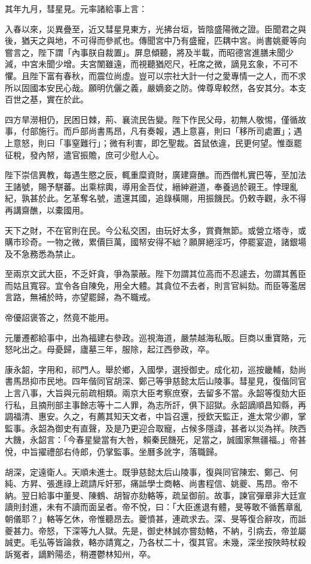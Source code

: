 \begin{pinyinscope}
其年九月，彗星見。元率諸給事上言：

入春以來，災異疊至，近又彗星見東方，光拂台垣，皆陰盛陽微之證。臣聞君之與後，猶天之與地，不可得而參貳也。傳聞宮中乃有盛寵，匹耦中宮。尚書姚夔等向嘗言之，陛下謂「內事朕自裁置」。屏息傾聽，將及半載，而昭德宮進膳未聞少減，中宮未聞少增。夫宮闈雖遠，而視聽猶咫尺，衽席之微，謫見玄象，不可不懼。且陛下富有春秋，而震位尚虛。豈可以宗社大計一付之愛專情一之人，而不求所以固國本安民心哉。願明伉儷之義，嚴嫡妾之防。俾尊卑較然，各安其分。本支百世之基，實在於此。

四方旱澇相仍，民困日棘，荊、襄流民告變。陛下作民父母，初無人敬惕，僅循故事，付部施行。而戶部尚書馬昂，凡有奏報，遇上意喜，則曰「移所司處置」；遇上意怒，則曰「事窒難行」；微有利害，即乞聖裁。首鼠依違，民更何望。惟亟罷征稅，發內帑，遣官振贍，庶可少慰人心。

陛下崇信異教，每遇生愍之辰，輒重糜資財，廣建齋醮。而西僧札實巴等，至加法王諸號，賜予駢蕃。出乘棕輿，導用金吾仗，縉紳避道，奉養過於親王。悖理亂紀，孰甚於此。乞革奪名號，遣還其國，追錄橫賜，用振饑民。仍敕寺觀，永不得再講齋醮，以橐國用。

天下之財，不在官則在民。今公私交困，由玩好太多，賞賚無節。或營立塔寺，或購市珍奇。一物之微，累價巨萬，國帑安得不絀？願屏絕淫巧，停罷宴遊，諸銀場及不急務悉為禁止。

至兩京文武大臣，不乏奸貪，爭為蒙蔽。陛下勿謂其位高而不忍遽去，勿謂其舊臣而姑且寬容。宜令各自陳免，用全大體。其貪位不去者，則言官糾劾。而臣等濫居言路，無補於時，亦望罷歸，為不職戒。

帝優詔褒答之，然竟不能用。

元屢遷都給事中，出為福建右參政。巡視海道，嚴禁越海私販。巨商以重寶賂，元怒叱出之。母憂歸，廬墓三年，服除，起江西參政，卒。

康永韶，字用和，祁門人。舉於鄉，入國學，選授御史。成化初，巡按畿輔，劾尚書馬昂抑市民地。四年偕同官胡深、鄭己等爭慈懿太后山陵事。彗星見，復偕同官上言八事，大旨與元前疏相類。兩京大臣考察庶寮，去留多不當。永韶等復劾大臣行私，且摘刑部主事餘志等十二人罪，為志所訐，俱下詔獄。永韶謫順昌知縣，再調福清、惠安。久之，有薦其知天文者，中旨召還，授欽天監正，進太常少卿，掌監事。永韶為御史有直聲，及是乃更迎合取寵，占候多隱諱，甚者以災為祥。陜西大饑，永韶言：「今春星變當有大咎，賴秦民饑死，足當之，誠國家無疆福。」帝甚悅，中旨擢禮部右侍郎，仍掌監事。坐曆多訛字，落職歸。

胡深，定遠衛人。天順未進士。既爭慈懿太后山陵事，復與同官陳宏、鄭己、何純、方昇、張進祿上疏請斥奸邪，痛詆學士商輅、尚書程信、姚夔、馬昂。帝不納。翌日給事中董旻、陳鶴、胡智亦劾輅等，疏呈御前。故事，諫官彈章非大廷宣讀則封進，未有不讀而面呈者。帝不悅，曰：「大臣進退有體，旻等敢不循舊章亂朝儀耶？」輅等乞休，帝惟聽昂去。夔憤甚，連疏求去。深、旻等復合辭攻，而詆夔甚力。帝怒，下深等九人獄。先是，御史林誠亦嘗劾輅，不納，引病去，帝並屬誠吏。毛弘等皆論救，輅亦請寬之，乃各杖二十，復其官。未幾，深坐按陜時杖殺訴冤者，謫黔陽丞，稍遷鬱林知州，卒。


\end{pinyinscope}
